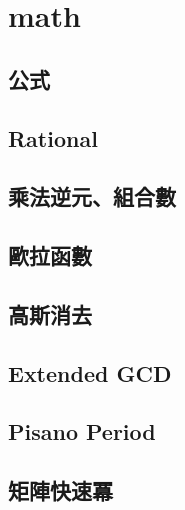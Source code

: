 \section{math}
    \subsection{公式}
        
    \subsection{Rational}
        
    \subsection{乘法逆元、組合數}
        
    \subsection{歐拉函數}
    \subsection{高斯消去}
        
    \subsection{Extended GCD}
    \subsection{Pisano Period}
        
    \subsection{矩陣快速冪}
         

